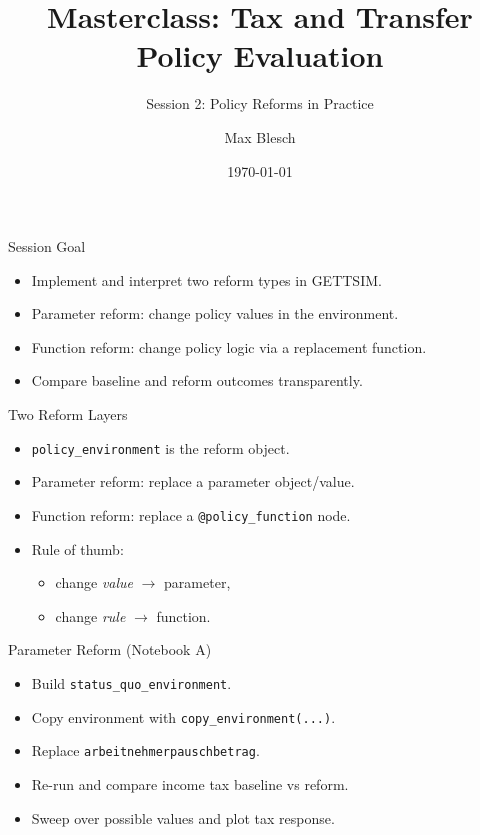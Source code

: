 \documentclass[aspectratio=169]{beamer}
\title{Masterclass: Tax and Transfer Policy Evaluation}
\subtitle{Session 2: Policy Reforms in Practice}
\author{Max Blesch}
\date{\today}
\begin{document}
\begin{frame}
  \titlepage
\end{frame}

\begin{frame}{Session Goal}
  \begin{itemize}
    \item Implement and interpret two reform types in GETTSIM.
    \item Parameter reform: change policy values in the environment.
    \item Function reform: change policy logic via a replacement function.
    \item Compare baseline and reform outcomes transparently.
  \end{itemize}
\end{frame}

\begin{frame}{Two Reform Layers}
  \begin{itemize}
    \item \texttt{policy\_environment} is the reform object.
    \item Parameter reform: replace a parameter object/value.
    \item Function reform: replace a \texttt{@policy\_function} node.
    \item Rule of thumb:
      \begin{itemize}
        \item change \emph{value} $\rightarrow$ parameter,
        \item change \emph{rule} $\rightarrow$ function.
      \end{itemize}
  \end{itemize}
\end{frame}

\begin{frame}{Parameter Reform (Notebook A)}
  \begin{itemize}
    \item Build \texttt{status\_quo\_environment}.
    \item Copy environment with \texttt{copy\_environment(...)}.
    \item Replace \texttt{arbeitnehmerpauschbetrag}.
    \item Re-run and compare income tax baseline vs reform.
    \item Sweep over possible values and plot tax response.
  \end{itemize}
\end{frame}
\end{document}
